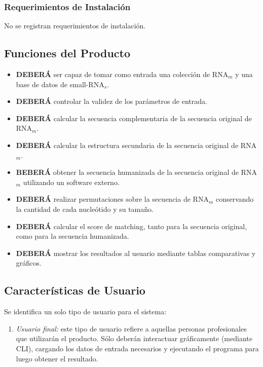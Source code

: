\documentclass[12pt,a4paper,spanish]{article}
\begin{document}
	\subsubsection{Requerimientos de Instalación}
		No se registran requerimientos de instalación.

\subsection{Funciones del Producto}
	\begin{itemize}
		\item \textbf{DEBERÁ} ser capaz de tomar como entrada una colección de RNA$_m$ y una base de datos de small-RNA$_s$. 
		\item \textbf{DEBERÁ} controlar la validez de los parámetros de entrada.
		\item \textbf{DEBERÁ} calcular la secuencia complementaria de la secuencia original de RNA$_m$.
		\item \textbf{DEBERÁ} calcular la estructura secundaria de la secuencia original de RNA$_m$.
		\item \textbf{BEBERÁ} obtener la secuencia humanizada de la secuencia original de RNA$_m$ utilizando un software 									externo.
		\item \textbf{DEBERÁ} realizar permutaciones sobre la secuencia de RNA$_m$ conservando la cantidad de cada 									nucleótido y su tamaño.
		\item \textbf{DEBERÁ} calcular el score de matching, tanto para la secuencia original, como para la secuencia 								humanizada.	
		\item \textbf{DEBERÁ} mostrar los resultados al usuario mediante tablas comparativas y gráficos.		
	\end{itemize}

\subsection{Características de Usuario}
	Se identifica un solo tipo de usuario para el sistema:
	\begin{enumerate}
 		\item \textit{Usuario final:} este tipo de usuario refiere a aquellas personas profesionales que utilizarán el 										producto. Sólo deberán interactuar gráficamente (mediante CLI), cargando los datos de 										entrada necesarios y ejecutando el programa para luego obtener el resultado. 
	\end{enumerate}
\end{document}
